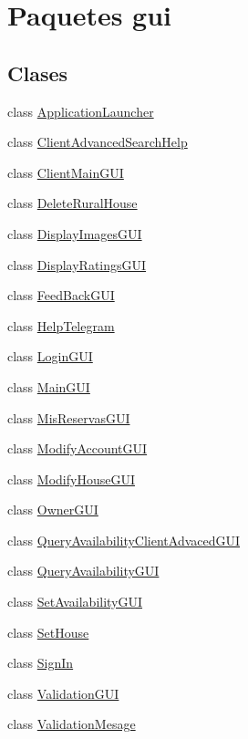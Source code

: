 \hypertarget{namespacegui}{}\section{Paquetes gui}
\label{namespacegui}
\subsection*{Clases}
\begin{DoxyCompactItemize}
\item 
class \mbox{\hyperlink{classgui_1_1_application_launcher}{Application\+Launcher}}
\item 
class \mbox{\hyperlink{classgui_1_1_client_advanced_search_help}{Client\+Advanced\+Search\+Help}}
\item 
class \mbox{\hyperlink{classgui_1_1_client_main_g_u_i}{Client\+Main\+G\+UI}}
\item 
class \mbox{\hyperlink{classgui_1_1_delete_rural_house}{Delete\+Rural\+House}}
\item 
class \mbox{\hyperlink{classgui_1_1_display_images_g_u_i}{Display\+Images\+G\+UI}}
\item 
class \mbox{\hyperlink{classgui_1_1_display_ratings_g_u_i}{Display\+Ratings\+G\+UI}}
\item 
class \mbox{\hyperlink{classgui_1_1_feed_back_g_u_i}{Feed\+Back\+G\+UI}}
\item 
class \mbox{\hyperlink{classgui_1_1_help_telegram}{Help\+Telegram}}
\item 
class \mbox{\hyperlink{classgui_1_1_login_g_u_i}{Login\+G\+UI}}
\item 
class \mbox{\hyperlink{classgui_1_1_main_g_u_i}{Main\+G\+UI}}
\item 
class \mbox{\hyperlink{classgui_1_1_mis_reservas_g_u_i}{Mis\+Reservas\+G\+UI}}
\item 
class \mbox{\hyperlink{classgui_1_1_modify_account_g_u_i}{Modify\+Account\+G\+UI}}
\item 
class \mbox{\hyperlink{classgui_1_1_modify_house_g_u_i}{Modify\+House\+G\+UI}}
\item 
class \mbox{\hyperlink{classgui_1_1_owner_g_u_i}{Owner\+G\+UI}}
\item 
class \mbox{\hyperlink{classgui_1_1_query_availability_client_advaced_g_u_i}{Query\+Availability\+Client\+Advaced\+G\+UI}}
\item 
class \mbox{\hyperlink{classgui_1_1_query_availability_g_u_i}{Query\+Availability\+G\+UI}}
\item 
class \mbox{\hyperlink{classgui_1_1_set_availability_g_u_i}{Set\+Availability\+G\+UI}}
\item 
class \mbox{\hyperlink{classgui_1_1_set_house}{Set\+House}}
\item 
class \mbox{\hyperlink{classgui_1_1_sign_in}{Sign\+In}}
\item 
class \mbox{\hyperlink{classgui_1_1_validation_g_u_i}{Validation\+G\+UI}}
\item 
class \mbox{\hyperlink{classgui_1_1_validation_mesage}{Validation\+Mesage}}
\end{DoxyCompactItemize}
